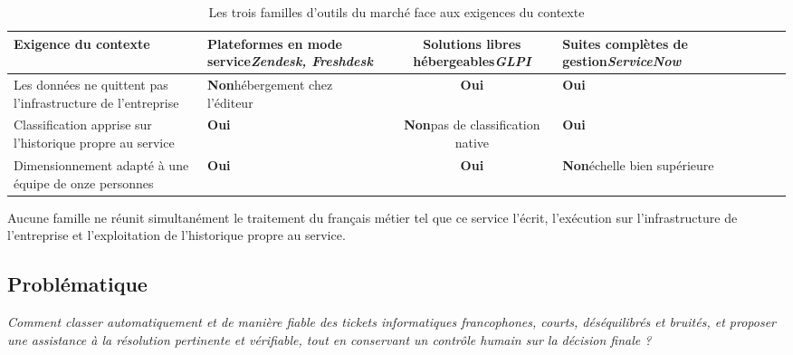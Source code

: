 \begin{table}[!htbp]
\centering
\singlespacing
\styletableau
\renewcommand{\arraystretch}{1.25}
\caption{Les trois familles d'outils du marché face aux exigences du contexte}
\label{tab:marche1}
\begin{tabular}{|Lp{4.0cm}|Cp{3.1cm}|Cp{3.1cm}|Cp{3.3cm}|}
\hline
{}
\textbf{Exigence du contexte} &
\textbf{Plateformes en mode service}\newline \small\textit{Zendesk, Freshdesk} &
\textbf{Solutions libres hébergeables}\newline \small\textit{GLPI} &
\textbf{Suites complètes de gestion}\newline \small\textit{ServiceNow} \\
\hline
Les données ne quittent pas l'infrastructure de l'entreprise &
\textbf{Non}\newline \small hébergement chez l'éditeur &
\textbf{Oui} &
\textbf{Oui} \\
\hline
Classification apprise sur l'historique propre au service &
\textbf{Oui} &
\textbf{Non}\newline \small pas de classification native &
\textbf{Oui} \\
\hline
Dimensionnement adapté à une équipe de onze personnes &
\textbf{Oui} &
\textbf{Oui} &
\textbf{Non}\newline \small échelle bien supérieure \\
\hline
\end{tabular}
\end{table}

Aucune famille ne réunit simultanément le traitement du français métier tel que ce service l'écrit,
l'exécution sur l'infrastructure de l'entreprise et l'exploitation de l'historique propre au
service.

\subsection{Problématique}

\begin{center}
\begin{minipage}{0.92\textwidth}
\itshape
Comment classer automatiquement et de manière fiable des tickets informatiques francophones, courts,
déséquilibrés et bruités, et proposer une assistance à la résolution pertinente et vérifiable, tout
en conservant un contrôle humain sur la décision finale ?
\end{minipage}
\end{center}

